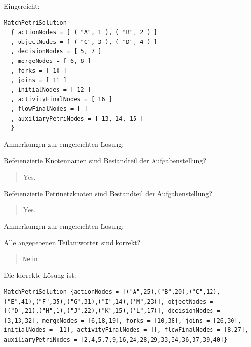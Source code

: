 Eingereicht:


\begin{verbatim}
MatchPetriSolution 
  { actionNodes = [ ( "A", 1 ), ( "B", 2 ) ]
  , objectNodes = [ ( "C", 3 ), ( "D", 4 ) ]
  , decisionNodes = [ 5, 7 ]
  , mergeNodes = [ 6, 8 ]
  , forks = [ 10 ]
  , joins = [ 11 ]
  , initialNodes = [ 12 ]
  , activityFinalNodes = [ 16 ]
  , flowFinalNodes = [ ]
  , auxiliaryPetriNodes = [ 13, 14, 15 ] 
  }
\end{verbatim}


Anmerkungen zur eingereichten Lösung:

Referenzierte Knotennamen sind Bestandteil der Aufgabenstellung?\begin{quote}Yes.\end{quote}Referenzierte Petrinetzknoten sind Bestandteil der Aufgabenstellung?\begin{quote}Yes.\end{quote}Anmerkungen zur eingereichten Lösung:

Alle angegebenen Teilantworten sind korrekt?

\begin{quote}
\begin{verbatim}
Nein.
\end{verbatim}
\end{quote}

Die korrekte Lösung ist:
\begin{verbatim}
MatchPetriSolution {actionNodes = [("A",25),("B",20),("C",12),("E",41),("F",35),("G",31),("I",14),("M",23)], objectNodes = [("D",21),("H",1),("J",22),("K",15),("L",17)], decisionNodes = [3,13,32], mergeNodes = [6,18,19], forks = [10,38], joins = [26,30], initialNodes = [11], activityFinalNodes = [], flowFinalNodes = [8,27], auxiliaryPetriNodes = [2,4,5,7,9,16,24,28,29,33,34,36,37,39,40]}
\end{verbatim}


